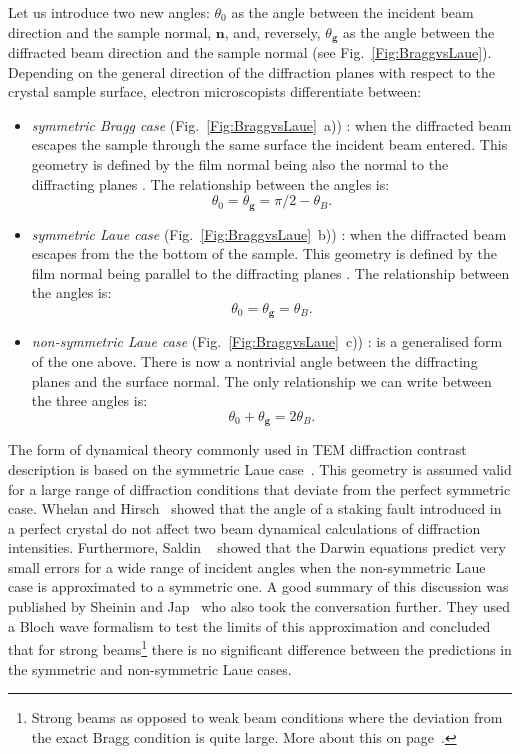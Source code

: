 Let us introduce two new angles: $\theta_0$ as the angle between the incident beam direction and the sample normal, $\mathbf{n}$,  and, reversely, $\theta_\mathbf{g}$ as the angle between the diffracted beam direction and the sample normal (see Fig.~\ref{Fig:BraggvsLaue}). 
Depending on the general direction of the diffraction planes with respect to the crystal sample surface, electron microscopists differentiate between:
\begin{itemize}
    \item \emph{symmetric Bragg case} (Fig.~\ref{Fig:BraggvsLaue}~a)) :  when the diffracted beam escapes the sample through the same surface the incident beam entered. This geometry is defined by the film normal being also the normal to the diffracting planes . The relationship between the angles is:
    \begin{equation*}
        \theta_0 =   \theta_\mathbf{g} =\pi/2 -\theta_B.
    \end{equation*}
     \item \emph{symmetric Laue case} (Fig.~\ref{Fig:BraggvsLaue}~b)) : when the diffracted beam escapes from the the bottom of the sample. This geometry is defined by the film normal being parallel to the  diffracting planes .  The relationship between the angles is:
      \[ \theta_0 =   \theta_\mathbf{g} = \theta_B.\]
    \item  \emph{non-symmetric Laue case} (Fig.~\ref{Fig:BraggvsLaue}~c)) : is a generalised form of the one above. There is now  a nontrivial angle between the diffracting planes and the surface normal. The only relationship we can write between the three angles is:
    \[ \theta_0 +  \theta_\mathbf{g} = 2 \theta_B.\]
\end{itemize}
\vspace{-0.5cm}

 The form of dynamical theory commonly used in TEM diffraction contrast description is based on the symmetric Laue case~\cite{Howie61}. This geometry is assumed valid for a large range of diffraction conditions that deviate from the perfect symmetric case.  Whelan and Hirsch~\cite{Whelan57} showed that the angle of a staking fault introduced in a perfect crystal do not affect two beam dynamical calculations of diffraction intensities. Furthermore, Saldin \etal~\cite{Saldin78} showed that the Darwin equations predict very small errors for a wide range of incident angles when the non-symmetric Laue case is approximated to a symmetric one. A good summary of this discussion was published by Sheinin and Jap~\cite{Sheinin79} who also took the conversation further. They used a Bloch wave formalism to test the limits of this approximation and concluded that for strong beams\footnote{ Strong beams as opposed to weak beam conditions where the deviation from the exact Bragg condition is quite large. More about this on page~\pageref{sec:sg}.} there is no significant difference between the predictions in the symmetric and non-symmetric Laue cases.



